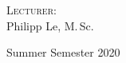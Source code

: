 \begin{titlepage}
\begin{center}
		\vspace{0.75cm}

		\normalsize
		\textsc{Lecturer:} \\
		Philipp Le, M.\,Sc.
		
		\vspace{0.75cm}
		
		\normalsize
		Summer Semester 2020
		
		\vspace{0.75cm}
		
	\end{center}
\end{titlepage}

